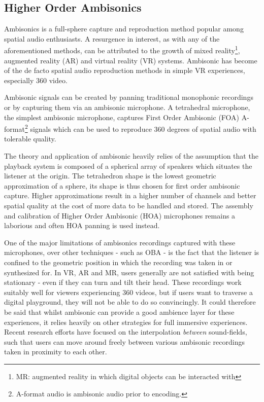 \subsection{Higher Order Ambisonics}
\label{subsec:ambi}

Ambisonics is a full-sphere capture and reproduction method popular among spatial audio enthusiasts. A resurgence in interest, as with any of the aforementioned methods, can be attributed to the growth of mixed reality\footnote{MR: augmented reality in which digital objects can be interacted with}, augmented reality (AR) and virtual reality (VR) systems. Ambisonic has become of the de facto spatial audio reproduction methods in simple VR experiences, especially 360 video. 

Ambisonic signals can be created by panning traditional monophonic recordings or by capturing them via an ambisonic microphone. A tetrahedral microphone, the simplest ambisonic microphone, captures First Order Ambisonic (FOA) A-format\footnote{A-format audio is ambisonic audio prior to encoding.} signals which can be used to reproduce 360 degrees of spatial audio with tolerable quality. 

The theory and application of ambisonic heavily relies of the assumption that the playback system is composed of a spherical array of speakers which situates the listener at the origin. The tetrahedron shape is the lowest geometric approximation of a sphere, its shape is thus chosen for first order ambisonic capture. Higher approximations result in a higher number of channels and better spatial quality at the cost of more data to be handled and stored. The assembly and calibration of Higher Order Ambisonic (HOA) microphones remains a laborious and often HOA panning is used instead.

One of the major limitations of ambisonics recordings captured with these microphones, over other techniques - such as OBA - is the fact that the listener is confined to the geometric position in which the recording was taken in or synthesized for. In VR, AR and MR, users generally are not satisfied with being stationary - even if they can turn and tilt their head. These recordings work suitably well for viewers experiencing 360 videos, but if users want to traverse a digital playground, they will not be able to do so convincingly. It could therefore be said that whilst ambisonic can provide a good ambience layer for these experiences, it relies heavily on other strategies for full immersive experiences. Recent research efforts have focused on the interpolation \textit{between} sound-fields, such that users can move around freely between various ambisonic recordings taken in proximity to each other. 

